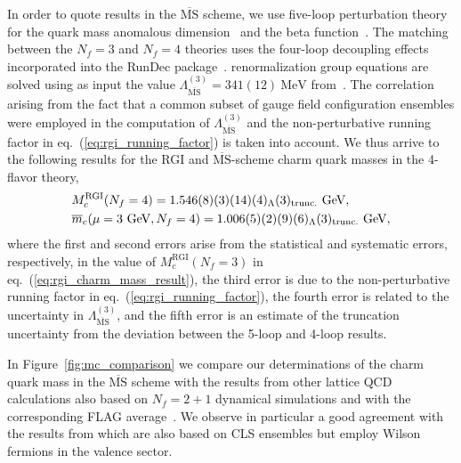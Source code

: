 In order to quote results in the $\overline{\textrm{MS}}$ scheme, we use five-loop perturbation theory for the quark
mass anomalous dimension~\cite{Baikov:2014qja,Luthe:2016xec,Baikov:2017ujl} and the beta function~\cite{Baikov:2016tgj,Herzog:2017ohr,Luthe:2017ttc}.
The matching between the $N_f=3$ and $N_f=4$ theories uses the four-loop decoupling effects~\cite{Liu:2015fxa}
incorporated into the RunDec package~\cite{Chetyrkin:2000yt,Schmidt:2012az,Herren:2017osy}. renormalization group equations are solved using as input the value 
$\Lambda^{(3)}_{\overline{\mathrm{MS}}} = 341(12)\ \mathrm{MeV}$ from~\cite{Bruno:2017gxd}. The correlation arising from the fact that a common subset of gauge field configuration ensembles were employed in the computation of $\Lambda^{(3)}_{\overline{\mathrm{MS}}}$ and the non-perturbative running factor in eq.~(\ref{eq:rgi_running_factor}) is taken into account. We thus arrive to the following results for the RGI and $\overline{\textrm{MS}}$-scheme charm quark masses in the 4-flavor theory,
\begin{align}
  &M_c^{\mathrm{RGI}}(N_f=4)=1.546(8)(3)(14)(4)_\Lambda(3)_{\rm trunc.} \ \mathrm{GeV},\\
  &\overline{m}_c(\mu=3\ \mathrm{GeV}, N_f=4)=1.006(5)(2)(9)(6)_\Lambda(3)_{\rm trunc.} \ \mathrm{GeV},
\end{align}
where the first and second errors arise from the statistical and systematic errors, respectively, in the value of $M_c^{\mathrm{RGI}}(N_f=3)$ in eq.~(\ref{eq:rgi_charm_mass_result}), the third error is due to the non-perturbative running factor in eq.~(\ref{eq:rgi_running_factor}), the fourth error is related to the uncertainty in $\Lambda^{(3)}_{\overline{\mathrm{MS}}}$, and the fifth error is an estimate of the truncation uncertainty from the deviation between the 5-loop and 4-loop results. 

In Figure~\ref{fig:mc_comparison} we compare our determinations of the charm quark mass in the $\overline{\textrm{MS}}$ scheme with the results from other lattice QCD calculations also based on $N_f=2+1$ dynamical simulations and with the corresponding FLAG average~\cite{FlavourLatticeAveragingGroupFLAG:2021npn}. We observe in particular a good agreement with the results from \cite{Heitger:2021apz} which are also based on CLS ensembles but employ Wilson fermions in the valence sector.

